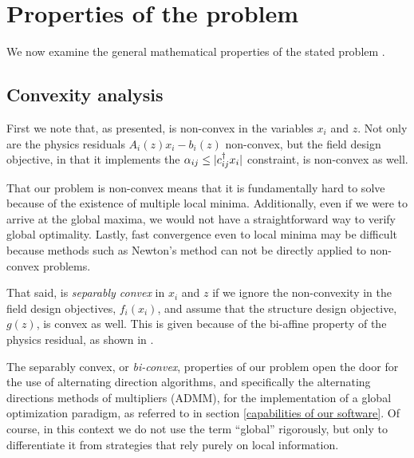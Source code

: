 \documentclass{book}
\begin{document}
\section{Properties of the problem}
We now examine the general mathematical properties 
    of the stated problem .

\subsection{Convexity analysis}
First we note that, as presented, 
     is non-convex 
    in the variables $x_i$ and $z$. %
Not only are the physics residuals $A_i(z)x_i - b_i(z)$ non-convex,
    but the field design objective, in that it implements the 
    $ \alpha_{ij} \le |c_{ij}^\dagger x_i| $ constraint, is non-convex as well.

That our problem is non-convex means that it is fundamentally hard to solve
    because of the existence of multiple local minima.
Additionally, even if we were to arrive at the global maxima,
    we would not have a straightforward way to verify global optimality.
Lastly, fast convergence even to local minima may be difficult
    because methods such as Newton's method
    can not be directly applied to non-convex problems.

That said,  is \emph{separably convex} 
    in $x_i$ and $z$ if we ignore the non-convexity
    in the field design objectives, $f_i(x_i)$, and
    assume that the structure design objective, $g(z)$, is convex as well.
This is given because of the bi-affine property
    of the physics residual, as shown in .

The separably convex, or \emph{bi-convex}, properties of our problem
    open the door for the use of alternating direction algorithms,
    and specifically the alternating directions 
    methods of multipliers (ADMM), %
    for the implementation of a global optimization paradigm,
    as referred to in section \ref{capabilities of our software}.
Of course, in this context we do not use the term ``global'' rigorously,
    but only to differentiate it from strategies that rely
    purely on local information.
\end{document}
